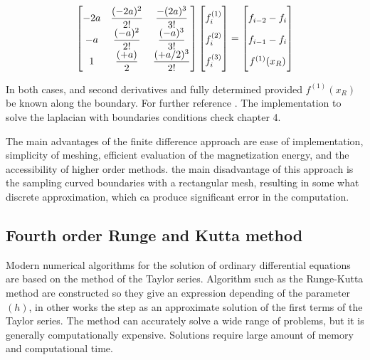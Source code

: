 \begin{align} \label{eq:matrix3}
\begin{bmatrix}
    -2a & \dfrac{(-2a)^2}{2!} & \dfrac{-(2a)^3}{3!}\\
    -a & \dfrac{(-a)^2}{2!} & \dfrac{(-a)^3}{3!}\\
    1 & \dfrac{(+a)}{2} & \dfrac{(+a/2)^3}{2!}
\end{bmatrix}
\begin{bmatrix}
    f_i^{(1)}  \vphantom{ \dfrac{d^4}{d} }\\
    f_i^{(2)}  \vphantom{ \dfrac{d^4}{d} } \\
    f_i^{(3)}  \vphantom{ \dfrac{d^4}{d} }
\end{bmatrix}
=
\begin{bmatrix}
    f_{i-2} - f_{i}    \vphantom{ \dfrac{d^4}{d}} \\
    f_{i-1} - f_{i}    \vphantom{ \dfrac{d^4}{d}} \\
    f^{(1)}(x_R)   \vphantom{ \dfrac{d^4}{d}}
\end{bmatrix}
\end{align}

In both cases, and second derivatives and fully determined provided $f^{(1)}(x_R)$ be known along the boundary. For further reference \cite{methods}. The implementation to solve the laplacian with boundaries conditions check chapter 4.

The main advantages of the finite difference approach are ease of implementation, simplicity of meshing, efficient evaluation of the magnetization energy, and the accessibility of higher order methods. the main disadvantage of this approach is the sampling curved boundaries with a rectangular mesh, resulting in some what discrete  approximation, which ca produce significant error in the computation.

\subsection{Fourth order Runge and Kutta method}

 Modern numerical algorithms for the solution of ordinary differential equations are based on the method of the Taylor series. Algorithm such as the Runge-Kutta method are constructed so they give an expression depending of the parameter $(h)$, in other works the step as an approximate solution of the first terms of the Taylor series. \cite{ufdtd}
The method can accurately solve a wide range of problems, but it is generally computationally expensive. Solutions require large amount of memory and computational time.

